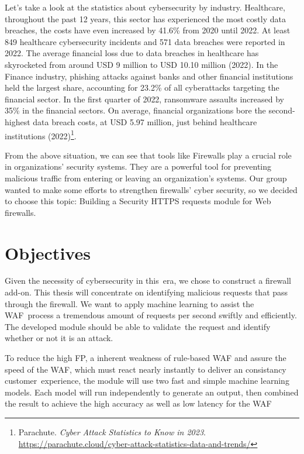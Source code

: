 Let's take a look at the statistics about cybersecurity by industry. Healthcare, throughout the past 12 years, this sector has experienced the most costly data breaches, the costs have even increased by 41.6\% from 2020 until 2022. At least 849 healthcare cybersecurity incidents and 571 data breaches were reported in 2022. The average financial loss due to data breaches in healthcare has skyrocketed from around USD 9 million to USD 10.10 million (2022). In the Finance industry, phishing attacks against banks and other financial institutions held the largest share, accounting for 23.2\% of all cyberattacks targeting the financial sector. In the first quarter of 2022, ransomware assaults increased by 35\% in the financial sectors. On average, financial organizations bore the second-highest data breach costs, at USD 5.97 million, just behind healthcare institutions (2022)\footnote{Parachute. \textit{Cyber Attack Statistics to Know in 2023}. \url{https://parachute.cloud/cyber-attack-statistics-data-and-trends/}}. 

From the above situation, we can see that tools like Firewalls play a crucial role in organizations' security systems. They are a powerful tool for preventing malicious traffic from entering or leaving an organization’s systems. Our group wanted to make some efforts to strengthen firewalls' cyber security, so we decided to choose this topic: Building a Security HTTPS requests module for Web firewalls.
\section{Objectives}
\label{sec:objectives}
Given the necessity of cybersecurity in this era, we chose to construct a firewall add-on. This thesis will concentrate on identifying malicious requests that pass through the firewall. We want to apply machine learning to assist the WAF process a tremendous amount of requests per second swiftly and efficiently. The developed module should be able to validate the request and identify whether or not it is an attack.

To reduce the high FP, a inherent weakness of rule-based WAF and assure the speed of the WAF, which must react nearly instantly to deliver an consistancy customer experience, the module will use two fast and simple machine learning models. Each model will run independently to generate an output, then combined the result to achieve the high accuracy as well as low latency for the WAF

